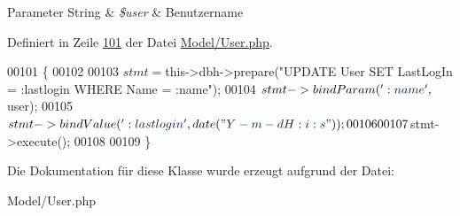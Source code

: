 \begin{DoxyParams}[1]{Parameter}
String & {\em \$user} & Benutzername \\
\hline
\end{DoxyParams}


Definiert in Zeile \hyperlink{_model_2_user_8php_source_l00101}{101} der Datei \hyperlink{_model_2_user_8php_source}{Model/\-User.\-php}.


\begin{DoxyCode}
00101                                                 \{
00102 
00103                 $stmt = $this->dbh->prepare(\textcolor{stringliteral}{"UPDATE User SET LastLogIn = :lastlogin WHERE Name = :name"});
00104                 $stmt->bindParam(\textcolor{stringliteral}{':name'}, $user);
00105                 $stmt->bindValue(\textcolor{stringliteral}{':lastlogin'}, date(\textcolor{stringliteral}{"Y-m-d H:i:s"}));
00106 
00107                 $stmt->execute();
00108                         
00109         \}
\end{DoxyCode}


Die Dokumentation für diese Klasse wurde erzeugt aufgrund der Datei\-:\begin{DoxyCompactItemize}
\item 
Model/\-User.\-php\end{DoxyCompactItemize}
